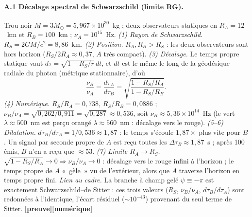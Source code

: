 \documentclass[11pt,a4paper]{article}
\newcommand{\st}[1]{\textbf{\textcolor{blue!45!black}{[#1]}}}
\begin{document}
\paragraph{A.1 Décalage spectral de Schwarzschild (limite RG).}
Trou noir $M=3M_\odot=5{,}967\times10^{30}$~kg ; deux observateurs statiques en $R_A=12$~km et $R_B=100$~km ; $\nu_A=10^{15}$~Hz.
\emph{(1) Rayon de Schwarzschild.} $R_S=2GM/c^2=8{,}86$~km.
\emph{(2) Position.} $R_A,R_B>R_S$ : les deux observateurs sont hors horizon ($R_S/2R_A\approx0{,}37$, $A$ très compact).
\emph{(3) Décalage.} Le temps propre statique vaut $d\tau=\sqrt{1-R_S/r}\,dt$, et $dt$ est le même le long de la géodésique radiale du photon (métrique stationnaire), d'où
\begin{equation}
\frac{\nu_B}{\nu_A}=\frac{d\tau_A}{d\tau_B}=\sqrt{\frac{1-R_S/R_A}{1-R_S/R_B}}. \tag{A.1}
\end{equation}
\emph{(4) Numérique.} $R_S/R_A=0{,}738$, $R_S/R_B=0{,}0886$ ; $\nu_B/\nu_A=\sqrt{0{,}262/0{,}911}=\sqrt{0{,}287}\approx\boxed{0{,}536}$, soit $\nu_B\approx5{,}36\times10^{14}$~Hz (le vert $\lambda\!\approx\!500$~nm est perçu orangé $\lambda\!\approx\!560$~nm : décalage vers le rouge).
\emph{(5--6) Dilatation.} $d\tau_B/d\tau_A=1/0{,}536\approx\boxed{1{,}87}$ : le temps s'écoule $1{,}87\times$ plus vite pour $B$. Un signal par seconde propre de $A$ est reçu toutes les $\Delta\tau_B\approx1{,}87$~s ; après 100 émis, $B$ n'en a reçu que $\approx53$.
\emph{(7) Limite $R_A\to R_S$.} $\sqrt{1-R_S/R_A}\to0\Rightarrow\nu_B/\nu_A\to0$ : décalage vers le rouge infini à l'horizon ; le temps propre de $A$ «~gèle~» vu de l'extérieur, alors que $A$ traverse l'horizon en temps propre fini.
\emph{Lien au cadre.} La branche à champ gelé $\psi\equiv-\pi$ est exactement Schwarzschild--de Sitter : ces trois valeurs ($R_S$, $\nu_B/\nu_A$, $d\tau_B/d\tau_A$) sont redonnées à l'identique, l'écart résiduel ($\sim10^{-43}$) provenant du seul terme de Sitter. \st{preuve}\st{numérique}
\end{document}
